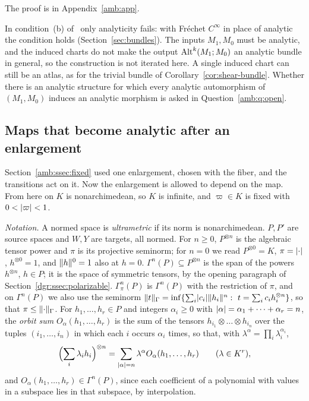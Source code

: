 The proof is in Appendix~\ref{amb:app}.

\begin{remark}\label{amb:rem:limits}
In condition~(b) of~\cite[n\textsuperscript{o}~7.6.1]{Bou} only analyticity fails: with Fr\'echet $C^\infty$ in place of analytic the condition holds (Section~\ref{sec:bundles}). The inputs $M_1,M_0$ must be analytic, and the induced charts do not make the output $\operatorname{Alt}^k(M_1;M_0)$ an analytic bundle in general, so the construction is not iterated here. A single induced chart can still be an atlas, as for the trivial bundle of Corollary~\ref{cor:shear-bundle}. Whether there is an analytic structure for which every analytic automorphism of $(M_1,M_0)$ induces an analytic morphism is asked in Question~\ref{amb:q:open}.
\end{remark}

\subsection{Maps that become analytic after an enlargement}\label{amb:ssec:some-j}

Section~\ref{amb:ssec:fixed} used one enlargement, chosen with the fiber, and the transitions act on it. Now the enlargement is allowed to depend on the map. From here on $K$ is nonarchimedean, so $K$ is infinite, and $\varpi\in K$ is fixed with $0<\lvert \varpi\rvert<1$.

\emph{Notation.} A normed space is \emph{ultrametric} if its norm is nonarchimedean. $P,P'$ are source spaces and $W,Y$ are targets, all normed. For $n\ge0$, $P^{\otimes n}$ is the algebraic tensor power and $\pi$ is its projective seminorm; for $n=0$ we read $P^{\otimes0}=K$, $\pi=\lvert \cdot\rvert$, $h^{\otimes0}=1$, and $\lVert h\rVert^0=1$ also at $h=0$. $\Gamma^n(P)\subseteq P^{\otimes n}$ is the span of the powers $h^{\otimes n}$, $h\in P$; it is the space of symmetric tensors, by the opening paragraph of Section~\ref{dgr:ssec:polarizable}. $\Gamma^n_\pi(P)$ is $\Gamma^n(P)$ with the restriction of $\pi$, and on $\Gamma^n(P)$ we also use the seminorm $\lVert t\rVert_\Gamma=\inf\{\sum_i\lvert c_i\rvert\lVert h_i\rVert^n:\ t=\sum_ic_ih_i^{\otimes n}\}$, so that $\pi\le\lVert \cdot\rVert_\Gamma$. For $h_1,\dots,h_r\in P$ and integers $\alpha_i\ge0$ with $\lvert \alpha\rvert=\alpha_1+\dots+\alpha_r=n$, the \emph{orbit sum} $O_\alpha(h_1,\dots,h_r)$ is the sum of the tensors $h_{i_1}\otimes\dots\otimes h_{i_n}$ over the tuples $(i_1,\dots,i_n)$ in which each $i$ occurs $\alpha_i$ times, so that, with $\lambda^\alpha=\prod_i\lambda_i^{\alpha_i}$,
\begin{equation}\label{amb:eq:orbit}
 \Bigl(\sum_i\lambda_ih_i\Bigr)^{\otimes n}=\sum_{\lvert \alpha\rvert=n}\lambda^\alpha O_\alpha(h_1,\dots,h_r)\qquad(\lambda\in K^r),
\end{equation}
and $O_\alpha(h_1,\dots,h_r)\in\Gamma^n(P)$, since each coefficient of a polynomial with values in a subspace lies in that subspace, by interpolation.

